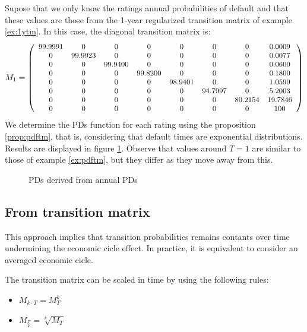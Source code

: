 \documentclass[11pt,fleqn]{book} %
\begin{document}
\begin{example}
	\label{ex:pdfsv}
	Supose that we only know the ratings annual probabilities of default 
	and that these values are those from the 1-year regularized transition 
	matrix of example \ref{ex:1ytm}. In this case, the diagonal transition 
	matrix is:
	\begin{displaymath}
		M_1 = \left(
		\small
		\begin{array}{cccccccc}
		99.9991 & 0 & 0 & 0 & 0 & 0 & 0 & 0.0009 \\
		0 & 99.9923 & 0 & 0 & 0 & 0 & 0 & 0.0077 \\
		0 & 0 & 99.9400 & 0 & 0 & 0 & 0 & 0.0600 \\
		0 & 0 & 0 & 99.8200 & 0 & 0 & 0 & 0.1800 \\
		0 & 0 & 0 & 0 & 98.9401 & 0 & 0 & 1.0599 \\
		0 & 0 & 0 & 0 & 0 & 94.7997 & 0 & 5.2003 \\
		0 & 0 & 0 & 0 & 0 & 0 & 80.2154 & 19.7846 \\
		0 & 0 & 0 & 0 & 0 & 0 & 0 & 100 \\
		\end{array}
		\right)
	\end{displaymath}
	We determine the PDs function for each rating using the proposition 
	\ref{prop:pdftm}, that is, considering that default times are exponential
	distributions. Results are displayed in figure \ref{fig:pdfsv}. Observe 
	that values around $T=1$ are similar to those of example \ref{ex:pdftm}, 
	but they differ as they move away from this.
	\begin{figure}[!ht]
		\centering
		\caption{PDs derived from annual PDs}
		\label{fig:pdfsv}
	\end{figure}
\end{example}

\subsection{From transition matrix}
\label{pdftm}

This approach implies that transition probabilities remains contants 
over time undermining the economic cicle effect. In practice, it is 
equivalent to consider an averaged economic cicle.

\begin{proposition}
	The transition matrix can be scaled in time by using the following rules:
	\begin{itemize}
		\item $M_{k \cdot T} = M_{T}^k$
		\item $M_{\frac{T}{k}} = \sqrt[k]{M_{T}}$
	\end{itemize}
\end{proposition}
\end{document}
